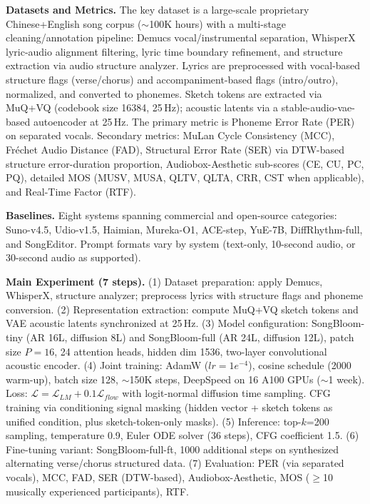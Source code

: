 \begin{tcolorbox}[
	title={Box 14: Case 2 --- Ground Truth Experimental Design Overview},
	colback=red!3!white,
	colframe=red!30!black,
	colbacktitle=red!15!white,
	coltitle=black,
	fonttitle=\bfseries,
	arc=3mm,
	boxrule=0.8pt,
	breakable
]
\small
\textbf{Datasets and Metrics.} The key dataset is a large-scale proprietary Chinese+English song corpus ($\sim$100K hours) with a multi-stage cleaning/annotation pipeline: Demucs vocal/instrumental separation, WhisperX lyric-audio alignment filtering, lyric time boundary refinement, and structure extraction via audio structure analyzer. Lyrics are preprocessed with vocal-based structure flags (verse/chorus) and accompaniment-based flags (intro/outro), normalized, and converted to phonemes. Sketch tokens are extracted via MuQ+VQ (codebook size 16384, 25\,Hz); acoustic latents via a stable-audio-vae-based autoencoder at 25\,Hz. The primary metric is Phoneme Error Rate (PER) on separated vocals. Secondary metrics: MuLan Cycle Consistency (MCC), Fr\'{e}chet Audio Distance (FAD), Structural Error Rate (SER) via DTW-based structure error-duration proportion, Audiobox-Aesthetic sub-scores (CE, CU, PC, PQ), detailed MOS (MUSV, MUSA, QLTV, QLTA, CRR, CST when applicable), and Real-Time Factor (RTF).

\smallskip
\textbf{Baselines.} Eight systems spanning commercial and open-source categories: Suno-v4.5, Udio-v1.5, Haimian, Mureka-O1, ACE-step, YuE-7B, DiffRhythm-full, and SongEditor. Prompt formats vary by system (text-only, 10-second audio, or 30-second audio as supported).

\smallskip
\textbf{Main Experiment (7 steps).} (1) Dataset preparation: apply Demucs, WhisperX, structure analyzer; preprocess lyrics with structure flags and phoneme conversion. (2) Representation extraction: compute MuQ+VQ sketch tokens and VAE acoustic latents synchronized at 25\,Hz. (3) Model configuration: SongBloom-tiny (AR 16L, diffusion 8L) and SongBloom-full (AR 24L, diffusion 12L), patch size $P=16$, 24 attention heads, hidden dim 1536, two-layer convolutional acoustic encoder. (4) Joint training: AdamW ($lr=1e^{-4}$), cosine schedule (2000 warm-up), batch size 128, $\sim$150K steps, DeepSpeed on 16 A100 GPUs ($\sim$1 week). Loss: $\mathcal{L}=\mathcal{L}_{LM}+0.1\mathcal{L}_{flow}$ with logit-normal diffusion time sampling. CFG training via conditioning signal masking (hidden vector + sketch tokens as unified condition, plus sketch-token-only masks). (5) Inference: top-$k$=200 sampling, temperature 0.9, Euler ODE solver (36 steps), CFG coefficient 1.5. (6) Fine-tuning variant: SongBloom-full-ft, 1000 additional steps on synthesized alternating verse/chorus structured data. (7) Evaluation: PER (via separated vocals), MCC, FAD, SER (DTW-based), Audiobox-Aesthetic, MOS ($\geq$10 musically experienced participants), RTF.


\end{tcolorbox}
